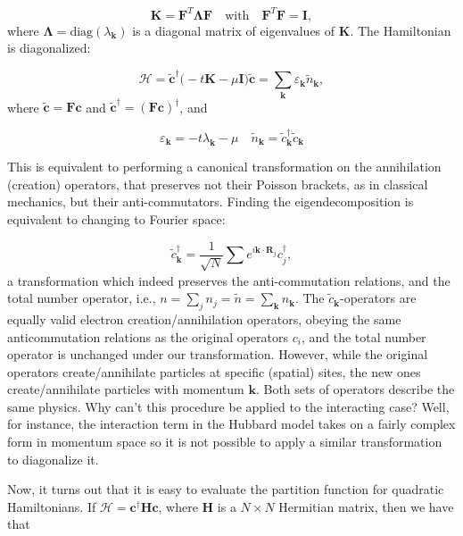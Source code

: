 \begin{equation}
\bm K = \bm F^T \bm \Lambda \bm F \quad \text{with}  \quad \bm F^T \bm F = \bm I ,
\end{equation}
where $\bm \Lambda = \text{diag}(\lambda_{\bm k})$ is a diagonal matrix of eigenvalues of $\bm K$.
The Hamiltonian is diagonalized:

\begin{equation}\label{eq:quadraticH}
\mathcal{H} =\tilde{\bm c}^\dagger \big( -t \bm K - \mu \bm I \big) \tilde{\bm c} = \sum_{\bm k} \varepsilon_{\bm k} \tilde{n}_{\bm k} ,
\end{equation}
where $\tilde{\bm c} = \bm F \bm c$ and $\tilde{\bm c}^\dagger = (\bm F \bm c)^\dagger$, and

\begin{equation}
\varepsilon_{\bm k} = -t \lambda_{\bm k} - \mu \quad \tilde{n}_{\bm k} = \tilde{c}_{\bm k}^\dagger \tilde{c}_{\bm k}
\end{equation}

This is equivalent to performing a canonical transformation on the annihilation (creation) operators, that preserves not their Poisson brackets, as in classical mechanics, but their anti-commutators.
Finding the eigendecomposition is equivalent to changing to Fourier space:

\begin{equation}
\tilde{c}_{\bm k}^\dagger = \frac{1}{\sqrt{N}} \sum_{} e^{i \bm k \cdot \bm R_j} c_j^\dagger ,
\end{equation}
a transformation which indeed preserves the anti-commutation relations, and the total number operator, i.e., $n = \sum_j n_j = \tilde{n} = \sum_{\bm k} n_{\bm k}$.
The $\tilde{c}_{\bm k}$-operators are equally valid electron creation/annihilation operators, obeying the same anticommutation relations as the original operators $c_i$, and the total number operator is unchanged under our transformation.
However, while the original operators create/annihilate particles at specific (spatial) sites, the new ones create/annihilate particles with momentum ${\bm k}$.
Both sets of operators describe the same physics.
Why can't this procedure be applied to the interacting case?
Well, for instance, the interaction term in the Hubbard model takes on a fairly complex form in momentum space so it is not possible to apply a similar transformation to diagonalize it.

Now, it turns out that it is easy to evaluate the partition function for quadratic Hamiltonians. If $\mathcal{H} = \bm c^\dagger \bm H \bm c$, where $\bm H$ is a $N \times N$ Hermitian matrix, then we have that

